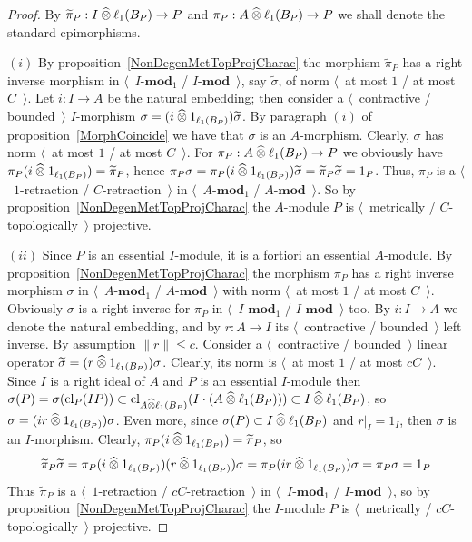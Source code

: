 \begin{proof} By $\widetilde{\pi}_P: I\mathbin{\widehat{\otimes}} \ell_1(B_P)\to P$ and
$\pi_P:A\mathbin{\widehat{\otimes}} \ell_1(B_P)\to P$ we shall denote the standard epimorphisms.

$(i)$ By proposition~\ref{NonDegenMetTopProjCharac} the morphism
$\widetilde{\pi}_P$ has a right inverse morphism in $\langle$~$I\text{-}\mathbf{mod}_1$
/ $I\text{-}\mathbf{mod}$~$\rangle$, say $\widetilde{\sigma}$, of norm $\langle$~at most
$1$ / at most $C$~$\rangle$. Let $i:I\to A$ be the natural embedding; then
consider a $\langle$~contractive / bounded~$\rangle$ $I$-morphism
$\sigma=(i\mathbin{\widehat{\otimes}} 1_{\ell_1(B_P)})\widetilde{\sigma}$. By paragraph $(i)$ of
proposition~\ref{MorphCoincide} we have that $\sigma$ is an $A$-morphism.
Clearly, $\sigma$ has norm $\langle$~at most $1$ / at most $C$~$\rangle$. For
$\pi_P:A\mathbin{\widehat{\otimes}} \ell_1(B_P)\to P$ we obviously 
have $\pi_P(i\mathbin{\widehat{\otimes}} 1_{\ell_1(B_P)})=\widetilde{\pi}_P$, 
hence 
$\pi_P\sigma
=\pi_P(i\mathbin{\widehat{\otimes}} 1_{\ell_1(B_P)})\widetilde{\sigma}
=\widetilde{\pi}_P\widetilde{\sigma}
=1_P$.
Thus, $\pi_P$ is a $\langle$~$1$-retraction / $C$-retraction~$\rangle$ in
$\langle$~$A\text{-}\mathbf{mod}_1$ / $A\text{-}\mathbf{mod}$~$\rangle$. So by
proposition~\ref{NonDegenMetTopProjCharac} the $A$-module $P$ is
$\langle$~metrically / $C$-topologically~$\rangle$ projective.

$(ii)$ Since $P$ is an essential $I$-module, it is a fortiori an essential
$A$-module. By proposition~\ref{NonDegenMetTopProjCharac} the morphism $\pi_P$
has a right inverse morphism $\sigma$ in $\langle$~$A\text{-}\mathbf{mod}_1$ /
$A\text{-}\mathbf{mod}$~$\rangle$ with norm $\langle$~at most $1$ / at most
$C$~$\rangle$. Obviously $\sigma$ is a right inverse for $\pi_P$ in
$\langle$~$I\text{-}\mathbf{mod}_1$ / $I\text{-}\mathbf{mod}$~$\rangle$ too. By $i:I\to A$ we
denote the natural embedding, and by $r:A\to I$ its $\langle$~contractive /
bounded~$\rangle$ left inverse. By assumption $\lVert r\rVert\leq c$. Consider a
$\langle$~contractive / bounded~$\rangle$ linear operator
$\widetilde{\sigma}=(r\mathbin{\widehat{\otimes}} 1_{\ell_1(B_P)})\sigma$. Clearly, its norm is
$\langle$~at most $1$ / at most $cC$~$\rangle$. Since $I$ is a right ideal of
$A$ and $P$ is an essential $I$-module then
$\sigma(P)
=\sigma(\operatorname{cl}_P(IP))
\subset\operatorname{cl}_{A\mathbin{\widehat{\otimes}} \ell_1(B_P)}(I\cdot (A\mathbin{\widehat{\otimes}} \ell_1(B_P)))
\subset I\mathbin{\widehat{\otimes}} \ell_1(B_P)$, so
$\sigma=(ir\mathbin{\widehat{\otimes}} 1_{\ell_1(B_P)})\sigma$. Even more, 
since $\sigma(P)\subset I\mathbin{\widehat{\otimes}}\ell_1(B_P)$ and $r|_I=1_I$, 
then $\sigma$ is an $I$-morphism.
Clearly, $\pi_P(i\mathbin{\widehat{\otimes}} 1_{\ell_1(B_P)})=\widetilde{\pi}_P$, so
\[
\widetilde{\pi}_P\widetilde{\sigma}
=\pi_P(i\mathbin{\widehat{\otimes}} 1_{\ell_1(B_P)})(r \mathbin{\widehat{\otimes}} 1_{\ell_1(B_P)})\sigma
=\pi_P(ir\mathbin{\widehat{\otimes}} 1_{\ell_1(B_P)})\sigma
=\pi_P\sigma
=1_P
\] 
Thus $\widetilde{\pi}_P$ is 
a $\langle$~$1$-retraction / $cC$-retraction~$\rangle$ 
in $\langle$~$I\text{-}\mathbf{mod}_1$ / $I\text{-}\mathbf{mod}$~$\rangle$, so by
proposition~\ref{NonDegenMetTopProjCharac} the $I$-module $P$ is
$\langle$~metrically / $cC$-topologically~$\rangle$ projective.
\end{proof}

